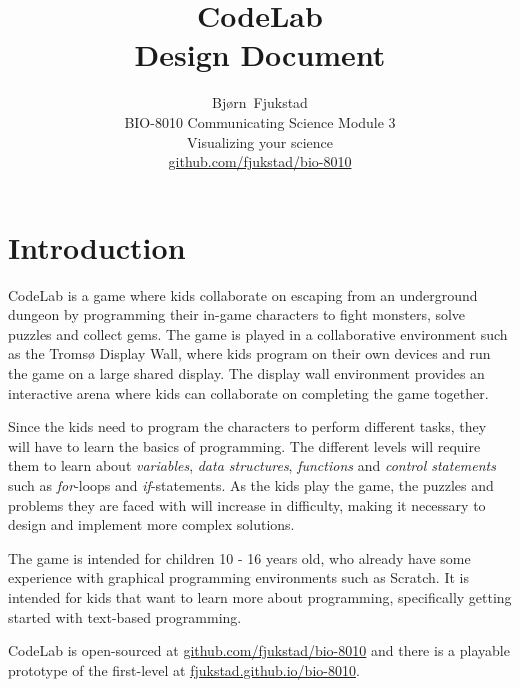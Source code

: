 \documentclass[12pt,journal,compsoc, a4paper, onecolumn]{IEEEtran}
\begin{document}
\title{CodeLab \\ Design Document}

\author{Bjørn~Fjukstad \\ BIO-8010 Communicating Science Module 3\\ Visualizing
your science \\ \url{github.com/fjukstad/bio-8010}} 

\maketitle
\vspace{-15mm}

\section{Introduction} 
CodeLab is a game where kids collaborate on escaping from an underground
dungeon by programming their in-game characters to fight monsters, solve puzzles
and collect gems. The game is played in a collaborative environment such as the
Tromsø Display Wall\cite{anshus2013nineyears}, where kids program on their own
devices and run the game on a large shared display. The display wall environment
provides an interactive arena where kids can collaborate on completing the game
together.

Since the kids need to program the characters to perform different tasks, they
will have to learn the basics of programming. The different levels will require
them to learn about \emph{variables}, \emph{data structures}, \emph{functions}
and \emph{control statements} such as \emph{for}-loops and \emph{if}-statements. 
As the kids play the game, the puzzles and problems they are faced with will
increase in difficulty, making it necessary to design and implement more
complex solutions. 

The game is intended for children 10 - 16 years old, who already have some
experience with graphical programming environments such as
Scratch\cite{resnick2009scratch}. It is intended for kids that want to learn
more about programming, specifically getting started with text-based
programming. 

CodeLab is open-sourced at \url{github.com/fjukstad/bio-8010} and there is a
playable prototype of the first-level at \url{fjukstad.github.io/bio-8010}. 

\end{document}
